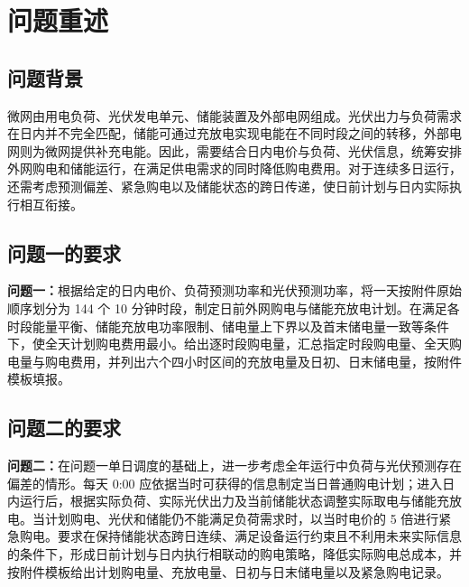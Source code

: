 \section{问题重述}

\subsection{问题背景}

微网由用电负荷、光伏发电单元、储能装置及外部电网组成。光伏出力与负荷需求在日内并不完全匹配，储能可通过充放电实现电能在不同时段之间的转移，外部电网则为微网提供补充电能。因此，需要结合日内电价与负荷、光伏信息，统筹安排外网购电和储能运行，在满足供电需求的同时降低购电费用。对于连续多日运行，还需考虑预测偏差、紧急购电以及储能状态的跨日传递，使日前计划与日内实际执行相互衔接。

\subsection{问题一的要求}

\textbf{问题一：}根据给定的日内电价、负荷预测功率和光伏预测功率，将一天按附件原始顺序划分为 144 个 10 分钟时段，制定日前外网购电与储能充放电计划。在满足各时段能量平衡、储能充放电功率限制、储电量上下界以及首末储电量一致等条件下，使全天计划购电费用最小。给出逐时段购电量，汇总指定时段购电量、全天购电量与购电费用，并列出六个四小时区间的充放电量及日初、日末储电量，按附件模板填报。

\subsection{问题二的要求}

\textbf{问题二：}在问题一单日调度的基础上，进一步考虑全年运行中负荷与光伏预测存在偏差的情形。每天 0:00 应依据当时可获得的信息制定当日普通购电计划；进入日内运行后，根据实际负荷、实际光伏出力及当前储能状态调整实际取电与储能充放电。当计划购电、光伏和储能仍不能满足负荷需求时，以当时电价的 5 倍进行紧急购电。要求在保持储能状态跨日连续、满足设备运行约束且不利用未来实际信息的条件下，形成日前计划与日内执行相联动的购电策略，降低实际购电总成本，并按附件模板给出计划购电量、充放电量、日初与日末储电量以及紧急购电记录。
